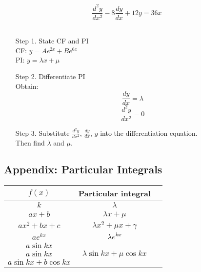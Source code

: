 \documentclass[a4paper,9pt]{scrartcl}
\begin{document}
    \begin{displaymath}
        \frac{d^{2}y}{dx^2} -8\frac{dy}{dx} + 12y = 36x
    \end{displaymath} \\
    \begin{itemize}
        \item [Step 1.] State CF and PI\\
        CF: $y = Ae^{2x}+Be^{6x}$\\
        PI: $y = {\lambda}x + \mu$\\

        \item [Step 2.] Differentiate PI\\
        Obtain: \\
        \begin{displaymath}
            \frac{dy}{dx} = \lambda
        \end{displaymath}
        \begin{displaymath}
            \frac{d^{2}y}{dx^2} = 0
        \end{displaymath}

        \item [Step 3.] Substitute $\frac{d^{2}y}{dx^2}$, $\frac{dy}{dx}$, $y$ into the differentiation equation.\\
        Then find $\lambda$ and $\mu$.
    \end{itemize}

    \subsection{Appendix: Particular Integrals}
    \begin{tabular}{|c|c|c|}
        \hline $f(x)$         & Particular integral                                  \\
        \hline $k$            & $\lambda$                                            \\
        \hline $ax+b$         & ${\lambda}x+\mu$                                     \\
        \hline $ax^2+bx+c$    & ${\lambda}x^2+{\mu}x+\gamma$                         \\
        \hline $ae^{kx}$      & ${\lambda}e^{kx}$                                    \\
        \hline $a\sin{kx}$    & \multirow{3}{*}{${\lambda}\sin{kx}+{\mu}{\cos{kx}}$} \\
        $a\sin{kx}$           &                                                      \\
        $a\sin{kx}+b\cos{kx}$ &                                                      \\
        \hline
    \end{tabular}
\end{document}
